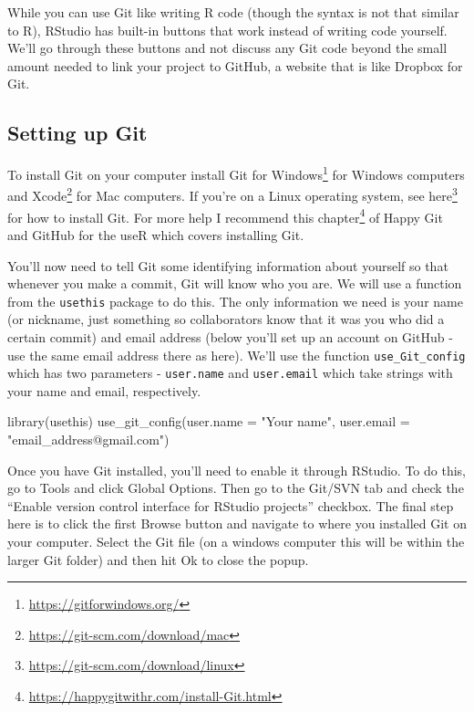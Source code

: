 \documentclass[
]{krantz}
\makeatletter
\newenvironment{Shaded}{\begin{snugshade}}{\end{snugshade}}
\newcommand{\AttributeTok}[1]{\textcolor[rgb]{0.61,0.61,0.61}{#1}}
\newcommand{\FunctionTok}[1]{\textcolor[rgb]{0,0,0}{#1}}
\newcommand{\NormalTok}[1]{#1}
\newcommand{\StringTok}[1]{\textcolor[rgb]{0.5,0.5,0.5}{#1}}
\renewcommand{\href}[2]{#2\footnote{\url{#1}}}
\newenvironment{kframe}{%
\medskip{}
\setlength{\fboxsep}{.8em}
 \def\at@end@of@kframe{}%
 \ifinner\ifhmode%
  \def\at@end@of@kframe{\end{minipage}}%
  \begin{minipage}{\columnwidth}%
 \fi\fi%
 \def\FrameCommand##1{\hskip\@totalleftmargin \hskip-\fboxsep
 \colorbox{shadecolor}{##1}\hskip-\fboxsep
     \hskip-\linewidth \hskip-\@totalleftmargin \hskip\columnwidth}%
 \MakeFramed {\advance\hsize-\width
   \@totalleftmargin\z@ \linewidth\hsize
   \@setminipage}}%
 {\par\unskip\endMakeFramed%
 \at@end@of@kframe}
\renewenvironment{Shaded}{\begin{kframe}}{\end{kframe}}
\makeatother
\begin{document}
While you can use Git like writing R code (though the syntax is not that similar to R), RStudio has built-in buttons that work instead of writing code yourself. We'll go through these buttons and not discuss any Git code beyond the small amount needed to link your project to GitHub, a website that is like Dropbox for Git.

\hypertarget{setting-up-git}{%
\subsection{Setting up Git}\label{setting-up-git}}

To install Git on your computer install \href{https://gitforwindows.org/}{Git for Windows} for Windows computers and \href{https://git-scm.com/download/mac}{Xcode} for Mac computers. If you're on a Linux operating system, see \href{https://git-scm.com/download/linux}{here} for how to install Git. For more help I recommend \href{https://happygitwithr.com/install-Git.html}{this chapter} of Happy Git and GitHub for the useR which covers installing Git.

You'll now need to tell Git some identifying information about yourself so that whenever you make a commit, Git will know who you are. We will use a function from the \texttt{usethis} package to do this. The only information we need is your name (or nickname, just something so collaborators know that it was you who did a certain commit) and email address (below you'll set up an account on GitHub - use the same email address there as here). We'll use the function \texttt{use\_Git\_config} which has two parameters - \texttt{user.name} and \texttt{user.email} which take strings with your name and email, respectively.

\begin{Shaded}
\begin{Highlighting}[]
\FunctionTok{library}\NormalTok{(usethis)}
\FunctionTok{use\_git\_config}\NormalTok{(}\AttributeTok{user.name =} \StringTok{"Your name"}\NormalTok{, }\AttributeTok{user.email =} \StringTok{"email\_address@gmail.com"}\NormalTok{)}
\end{Highlighting}
\end{Shaded}

Once you have Git installed, you'll need to enable it through RStudio. To do this, go to Tools and click Global Options. Then go to the Git/SVN tab and check the ``Enable version control interface for RStudio projects'' checkbox. The final step here is to click the first Browse button and navigate to where you installed Git on your computer. Select the Git file (on a windows computer this will be within the larger Git folder) and then hit Ok to close the popup.
\end{document}
